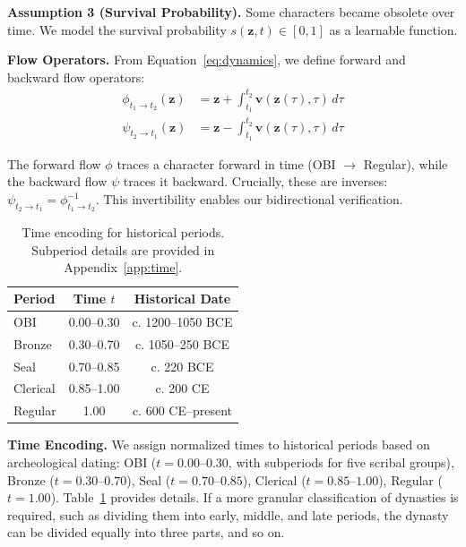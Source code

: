 \documentclass{article}
\begin{document}
\textbf{Assumption 3 (Survival Probability).} Some characters became obsolete over time. We model the survival probability $s(\mathbf{z}, t) \in [0,1]$ as a learnable function.

\textbf{Flow Operators.} From Equation~\ref{eq:dynamics}, we define forward and backward flow operators:
\begin{align}
\phi_{t_1 \to t_2}(\mathbf{z}) &= \mathbf{z} + \int_{t_1}^{t_2} \mathbf{v}(\mathbf{z}(\tau), \tau) \, d\tau \label{eq:forward_flow} \\
\psi_{t_2 \to t_1}(\mathbf{z}) &= \mathbf{z} - \int_{t_1}^{t_2} \mathbf{v}(\mathbf{z}(\tau), \tau) \, d\tau \label{eq:backward_flow}
\end{align}

The forward flow $\phi$ traces a character forward in time (OBI $\to$ Regular), while the backward flow $\psi$ traces it backward. Crucially, these are inverses: $\psi_{t_2 \to t_1} = \phi_{t_1 \to t_2}^{-1}$. This invertibility enables our bidirectional verification.


\begin{table} %
\vspace{-1.2em} %
\centering
\small
\caption{Time encoding for historical periods. Subperiod details are provided in Appendix~\ref{app:time}.}
\label{tab:time}
\begin{tabular}{lcc}
\toprule
\textbf{Period} & \textbf{Time $t$} & \textbf{Historical Date} \\
\midrule
OBI & 0.00--0.30 & c. 1200--1050 BCE \\
Bronze & 0.30--0.70 & c. 1050--250 BCE \\
Seal & 0.70--0.85 & c. 220 BCE \\
Clerical & 0.85--1.00 & c. 200 CE \\
Regular & 1.00 & c. 600 CE--present \\
\bottomrule
\end{tabular}
\vspace{-2em}
\end{table}


\textbf{Time Encoding.} We assign normalized times to historical periods based on archeological dating: OBI ($t = 0.00$--$0.30$, with subperiods for five scribal groups), Bronze ($t = 0.30$--$0.70$), Seal ($t = 0.70$--$0.85$), Clerical ($t = 0.85$--$1.00$), Regular ($t = 1.00$). Table~\ref{tab:time} provides details. If a more granular classification of dynasties is required, such as dividing them into early, middle, and late periods, the dynasty can be divided equally into three parts, and so on.
\end{document}
